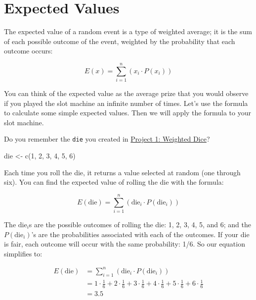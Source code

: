 \documentclass[
  letterpaper,
  DIV=11,
  numbers=noendperiod]{scrbook}
\newenvironment{Shaded}{\begin{snugshade}}{\end{snugshade}}
\newcommand{\DecValTok}[1]{\textcolor[rgb]{0.68,0.00,0.00}{#1}}
\newcommand{\FunctionTok}[1]{\textcolor[rgb]{0.28,0.35,0.67}{#1}}
\newcommand{\NormalTok}[1]{\textcolor[rgb]{0.00,0.23,0.31}{#1}}
\newcommand{\OtherTok}[1]{\textcolor[rgb]{0.00,0.23,0.31}{#1}}
\begin{document}
\section{Expected Values}\label{expected-values}

The expected value of a random event is a type of weighted average; it
is the sum of each possible outcome of the event, weighted by the
probability that each outcome occurs:

\[
E(x) = \sum_{i = 1}^{n}\left( x_{i} \cdot P(x_{i}) \right)
\]

You can think of the expected value as the average prize that you would
observe if you played the slot machine an infinite number of times.
Let's use the formula to calculate some simple expected values. Then we
will apply the formula to your slot machine.

Do you remember the \texttt{die} you created in
\hyperref[sec-project-dice]{Project 1: Weighted Dice}?

\begin{Shaded}
\begin{Highlighting}[]
\NormalTok{die }\OtherTok{\textless{}{-}} \FunctionTok{c}\NormalTok{(}\DecValTok{1}\NormalTok{, }\DecValTok{2}\NormalTok{, }\DecValTok{3}\NormalTok{, }\DecValTok{4}\NormalTok{, }\DecValTok{5}\NormalTok{, }\DecValTok{6}\NormalTok{)}
\end{Highlighting}
\end{Shaded}

Each time you roll the die, it returns a value selected at random (one
through six). You can find the expected value of rolling the die with
the formula:

\[
E(\text{die}) = \sum_{i = 1}^{n}\left( \text{die}_{i} \cdot P(\text{die}_{i}) \right)
\]

The \(\text{die}_{i}\)s are the possible outcomes of rolling the die: 1,
2, 3, 4, 5, and 6; and the \(P(\text{die}_{i})\)'s are the probabilities
associated with each of the outcomes. If your die is fair, each outcome
will occur with the same probability: 1/6. So our equation simplifies
to:

\[
\begin{array}{rl}
E(\text{die}) & = \sum_{i = 1}^{n}\left( \text{die}_{i} \cdot P(\text{die}_{i}) \right)\\
& = 1 \cdot \frac{1}{6} +  2 \cdot \frac{1}{6} + 3 \cdot \frac{1}{6} + 4 \cdot \frac{1}{6} + 5 \cdot \frac{1}{6} + 6 \cdot \frac{1}{6}\\
& = 3.5\\
\end{array}
\]
\end{document}
